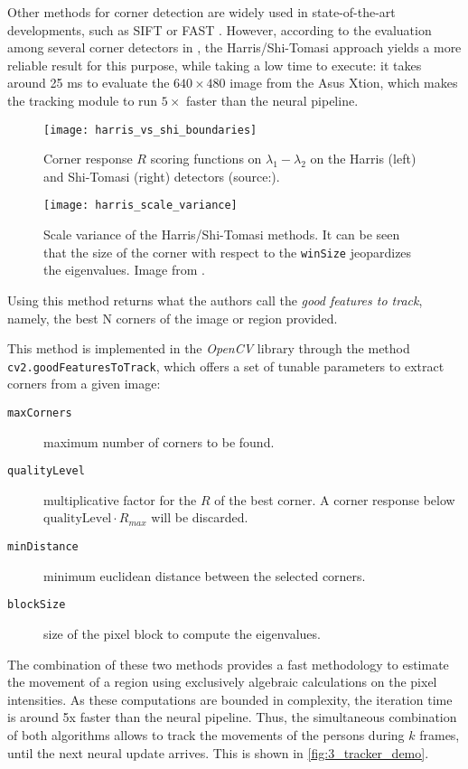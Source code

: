 Other methods for corner detection are widely used in state-of-the-art developments, such as SIFT \cite{sift} or FAST \cite{fast}. However, according to the evaluation among several corner detectors in \cite{corner_detectors}, the Harris/Shi-Tomasi approach yields a more reliable result for this purpose, while taking a low time to execute: it takes around 25 ms to evaluate the $640\times 480$ image from the Asus Xtion, which makes the tracking module to run $5\times$ faster than the neural pipeline.

\begin{figure}[h]
	\centering
	\texttt{[image: harris\_vs\_shi\_boundaries]}
	\caption{Corner response $R$ scoring functions on $\lambda_1-\lambda_2$ on the Harris (left) and Shi-Tomasi (right) detectors (source:\cite{nanonets_optical_flow}).}
	\label{fig:3_harris_vs_shi}
\end{figure}

\begin{figure}[h]
	\centering
	\texttt{[image: harris\_scale\_variance]}
	\caption{Scale variance of the Harris/Shi-Tomasi methods. It can be seen that the size of the corner with respect to the \texttt{winSize} jeopardizes the eigenvalues. Image from \cite{diapos_cv_features}.}
	\label{fig:3_harris_scale}
\end{figure}

Using this method returns what the authors call the \textit{good features to track}, namely, the best N corners of the image or region provided.

 This method is implemented in the \textit{OpenCV} library through the method \texttt{cv2.goodFeaturesToTrack}, which offers a set of tunable parameters to extract corners from a given image:
 \begin{description}
 	\item[\texttt{maxCorners}] maximum number of corners to be found.
 	\item[\texttt{qualityLevel}] multiplicative factor for the $R$ of the best corner. A corner response below $\text{qualityLevel}\cdot R_{max}$ will be discarded.
 	\item[\texttt{minDistance}] minimum euclidean distance between the selected corners.
 	\item[\texttt{blockSize}] size of the pixel block to compute the eigenvalues.
 \end{description}

The combination of these two methods provides a fast methodology to estimate the movement of a region using exclusively algebraic calculations on the pixel intensities. As these computations are bounded in complexity, the iteration time is around 5x faster than the neural pipeline. Thus, the simultaneous combination of both algorithms allows to track the movements of the persons during $k$ frames, until the next neural update arrives. This is shown in \autoref{fig:3_tracker_demo}.\\


